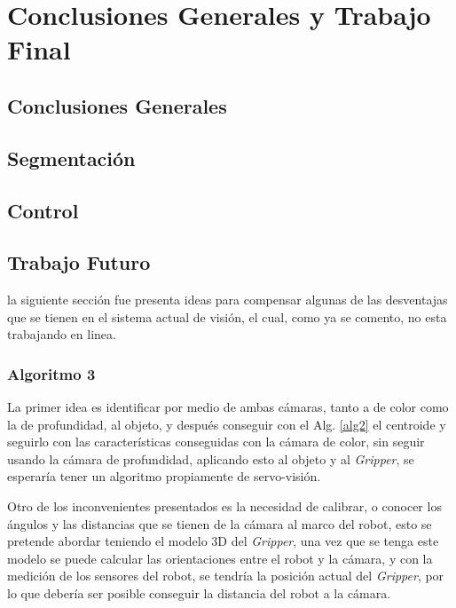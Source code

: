 \chapter{Conclusiones Generales y Trabajo Final}


\section{Conclusiones Generales}

\section{Segmentación}

\section{Control}

\section{Trabajo Futuro}


la siguiente sección fue presenta ideas para compensar algunas de las desventajas que se tienen en el sistema actual de visión, el cual, como ya se comento, no esta trabajando en linea.

\subsection{Algoritmo  3}

La primer idea es identificar por medio de ambas cámaras, tanto a de color como la de profundidad, al objeto, y después conseguir con el Alg. \ref{alg2} el centroide y seguirlo con las características conseguidas con la cámara de color, sin seguir usando la cámara de profundidad, aplicando esto al objeto y al \textit{Gripper}, se esperaría tener un algoritmo propiamente de servo-visión.

Otro de los inconvenientes presentados es la necesidad de calibrar, o conocer los ángulos y las distancias que se tienen de la cámara al marco del robot, esto se pretende abordar teniendo el modelo 3D del \textit{Gripper}, una vez que se tenga este modelo se puede calcular las orientaciones entre el robot y la cámara, y con la medición de los sensores del robot, se tendría la posición actual del \textit{Gripper}, por lo que debería ser posible conseguir la distancia del robot a la cámara.






